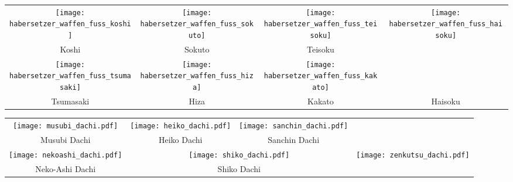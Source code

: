\clearpage
\pagebreak
\setcounter{num}{0}
\setcounter{numz}{0}
\begin{tcolorbox}[colframe=GKD,colback=white,coltitle=white,title=Allgemeines:\indent Körperwaffen\indent {\scriptsize \textcopyright\,Roland Habersetzer - Die Grundtechniken des Karate - Auszüge}]
	\null\vfill\null	
	\begin{tabularx}{\textwidth}{cccc}
		\texttt{[image: habersetzer\_waffen\_fuss\_koshi]} 		& \texttt{[image: habersetzer\_waffen\_fuss\_sokuto]} 		& \texttt{[image: habersetzer\_waffen\_fuss\_teisoku]} &
		\multirow{3}{*}{\texttt{[image: habersetzer\_waffen\_fuss\_haisoku]}}
		\\
		Koshi 		& Sokuto 	& Teisoku &\\
		\texttt{[image: habersetzer\_waffen\_fuss\_tsumasaki]} 	& \texttt{[image: habersetzer\_waffen\_fuss\_hiza]} 		&  \texttt{[image: habersetzer\_waffen\_fuss\_kakato]} &\\
		Tsumasaki 	& Hiza 		& Kakato & Haisoku\\
	\end{tabularx}
	\null\vfill\null
\end{tcolorbox}
\clearpage
\pagebreak
\begin{tcolorbox}[colframe=GKD,colback=white,coltitle=white,title=Allgemeines:\indent Grundlegende Dachi Waza]
	\null\vfill\null
	\setcounter{num}{0}
	\setcounter{numz}{0}	
	\begin{tabularx}{\textwidth}{cccc}
		\texttt{[image: musubi\_dachi.pdf]}	&
		\texttt{[image: heiko\_dachi.pdf]} &
		\texttt{[image: sanchin\_dachi.pdf]} & \\
		Musubi Dachi 		& Heiko Dachi 	& Sanchin Dachi & \\
		\texttt{[image: nekoashi\_dachi.pdf]} & \multicolumn{2}{c}{\texttt{[image: shiko\_dachi.pdf]}} & \multirow[t]{3}{*}{\texttt{[image: zenkutsu\_dachi.pdf]}}\\
		Neko-Ashi Dachi 	& \multicolumn{2}{c}{Shiko Dachi} 	& Zenkutsu Dachi  \\							
	\end{tabularx}\\\null\vfill\null
\end{tcolorbox}
\clearpage
\pagebreak
